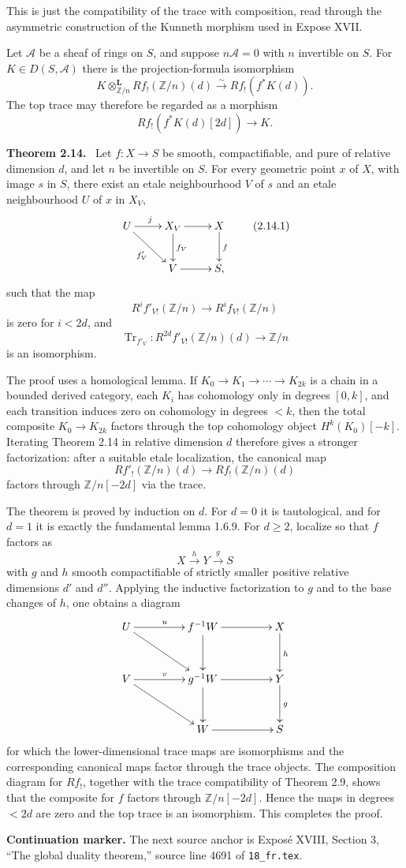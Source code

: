 \documentclass[12pt]{article}
\newcommand{\Zz}{\mathbb Z}
\newenvironment{statement}[1]{\par\medskip\noindent\textbf{#1.}\ }{\par\medskip}
\begin{document}
This is just the compatibility of the trace with composition, read through the asymmetric construction of the Kunneth morphism used in Expose XVII.

Let \(\mathcal A\) be a sheaf of rings on \(S\), and suppose \(n\mathcal A=0\) with \(n\) invertible on \(S\). For \(K\in D(S,\mathcal A)\) there is the projection-formula isomorphism
\[
K\otimes^{\mathbf L}_{\Zz/n}Rf_!(\Zz/n)(d)
\xrightarrow{\sim}
Rf_!(f^*K(d)).
\tag{2.13.1}
\]
The top trace may therefore be regarded as a morphism
\[
Rf_!(f^*K(d)[2d])\longrightarrow K.
\tag{2.13.2}
\]

\begin{statement}{Theorem 2.14}
Let \(f:X\to S\) be smooth, compactifiable, and pure of relative dimension \(d\), and let \(n\) be invertible on \(S\). For every geometric point \(x\) of \(X\), with image \(s\) in \(S\), there exist an etale neighbourhood \(V\) of \(s\) and an etale neighbourhood \(U\) of \(x\) in \(X_V\),
\[
\xymatrix{
U\ar[r]^j\ar[rd]_{f'_V}&X_V\ar[r]\ar[d]^{f_V}&X\ar[d]^f\\
&V\ar[r]&S,
}
\tag{2.14.1}
\]
such that the map
\[
R^if'_{V!}(\Zz/n)\to R^if_{V!}(\Zz/n)
\]
is zero for \(i<2d\), and
\[
\operatorname{Tr}_{f'_V}:R^{2d}f'_{V!}(\Zz/n)(d)\to\Zz/n
\]
is an isomorphism.
\end{statement}

The proof uses a homological lemma. If \(K_0\to K_1\to\cdots\to K_{2k}\) is a chain in a bounded derived category, each \(K_i\) has cohomology only in degrees \([0,k]\), and each transition induces zero on cohomology in degrees \(<k\), then the total composite \(K_0\to K_{2k}\) factors through the top cohomology object \(H^k(K_0)[-k]\). Iterating Theorem 2.14 in relative dimension \(d\) therefore gives a stronger factorization: after a suitable etale localization, the canonical map
\[
Rf'_!(\Zz/n)(d)\to Rf_!(\Zz/n)(d)
\]
factors through \(\Zz/n[-2d]\) via the trace.

The theorem is proved by induction on \(d\). For \(d=0\) it is tautological, and for \(d=1\) it is exactly the fundamental lemma 1.6.9. For \(d\geq2\), localize so that \(f\) factors as
\[
X\xrightarrow{h}Y\xrightarrow{g}S
\]
with \(g\) and \(h\) smooth compactifiable of strictly smaller positive relative dimensions \(d'\) and \(d''\). Applying the inductive factorization to \(g\) and to the base changes of \(h\), one obtains a diagram
\[
\xymatrix@C=1.6cm@R=1.1cm{
U\ar[r]^u\ar[rd]&f^{-1}W\ar[r]\ar[d]&X\ar[d]^h\\
V\ar[r]^v\ar[rd]&g^{-1}W\ar[r]\ar[d]&Y\ar[d]^g\\
&W\ar[r]&S
}
\]
for which the lower-dimensional trace maps are isomorphisms and the corresponding canonical maps factor through the trace objects. The composition diagram for \(Rf_!\), together with the trace compatibility of Theorem 2.9, shows that the composite for \(f\) factors through \(\Zz/n[-2d]\). Hence the maps in degrees \(<2d\) are zero and the top trace is an isomorphism. This completes the proof.

\bigskip
\noindent\textbf{Continuation marker.} The next source anchor is Expos\'e XVIII, Section 3, ``The global duality theorem,'' source line 4691 of \texttt{18\_fr.tex}.
\end{document}
